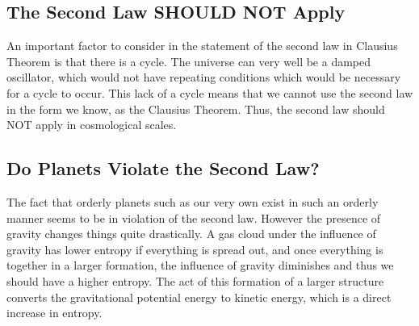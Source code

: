 \documentclass[12pt]{article}
\begin{document}
\subsection{The Second Law SHOULD NOT Apply}
An important factor to consider in the statement of the second law in Clausius Theorem is that there is a cycle. The universe can very well be a damped oscillator, which would not have repeating conditions which would be necessary for a cycle to occur. This lack of a cycle means that we cannot use the second law in the form we know, as the Clausius Theorem. Thus, the second law should NOT apply in cosmological scales.

\subsection{Do Planets Violate the Second Law?}
The fact that orderly planets such as our very own exist in such an orderly manner seems to be in violation of the second law. However the presence of gravity changes things quite drastically. A gas cloud under the influence of gravity has lower entropy if everything is spread out, and once everything is together in a larger formation, the influence of gravity diminishes and thus we should have a higher entropy. The act of this formation of a larger structure converts the gravitational potential energy to kinetic energy, which is a direct increase in entropy. 
\end{document}
